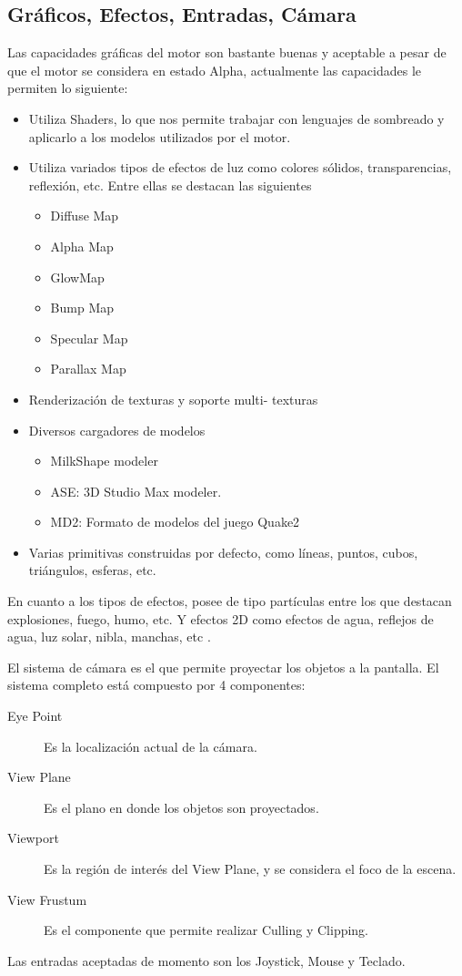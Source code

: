 \documentclass[a4paper,12pt,openany,oneside]{book}
\begin{document}
\subsection{Gráficos, Efectos, Entradas, Cámara}
Las capacidades gráficas del motor son bastante buenas y aceptable a pesar de que el motor se considera en estado Alpha, actualmente las capacidades le permiten lo siguiente:
\begin{itemize}
\item Utiliza Shaders, lo que nos permite trabajar con lenguajes de sombreado y aplicarlo a los modelos utilizados por el motor.
\item Utiliza variados tipos de efectos de luz como colores sólidos, transparencias, reflexión, etc. Entre ellas se destacan las siguientes \cite{JMONKEY} 
\begin{itemize}
\item Diffuse Map
\item Alpha Map
\item GlowMap
\item Bump Map
\item Specular Map
\item Parallax Map
\end{itemize}
\item Renderización de texturas y soporte multi- texturas
\item Diversos cargadores de modelos
\begin{itemize}
\item MilkShape modeler
\item ASE: 3D Studio Max modeler.
\item MD2: Formato de modelos del juego Quake2
\end{itemize}
\item Varias primitivas construidas por defecto, como líneas, puntos, cubos, triángulos, esferas, etc. 
\end{itemize}
En cuanto a los tipos de efectos, posee de tipo partículas entre los que destacan explosiones, fuego, humo, etc. Y efectos 2D como efectos de agua, reflejos de agua, luz solar, nibla, manchas, etc \cite{JMONKEY}. 

El sistema de cámara es el que permite proyectar los objetos a la pantalla. El sistema completo está compuesto por 4 componentes:
\begin{description}
\item[Eye Point] Es la localización actual de la cámara.
\item[View Plane] Es el plano en donde los objetos son proyectados.
\item[Viewport] Es la región de interés del View Plane, y se considera el foco de la escena. 
\item[View Frustum] Es el componente que permite realizar Culling y Clipping. 
\end{description}
Las entradas aceptadas de momento son los Joystick, Mouse y Teclado.
\end{document}
